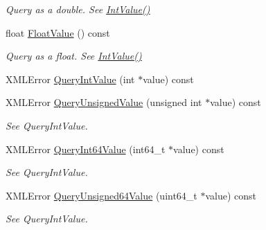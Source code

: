 \begin{DoxyCompactItemize}
\begin{DoxyCompactList}\small\item\em Query as a double. See \hyperlink{classtinyxml2_1_1_x_m_l_attribute_adfa2433f0fdafd5c3880936de9affa80}{Int\+Value()} \end{DoxyCompactList}\item 
\mbox{\label{classtinyxml2_1_1_x_m_l_attribute_a27797b45d21c981257720db94f5f8801}} 
float \hyperlink{classtinyxml2_1_1_x_m_l_attribute_a27797b45d21c981257720db94f5f8801}{Float\+Value} () const
\begin{DoxyCompactList}\small\item\em Query as a float. See \hyperlink{classtinyxml2_1_1_x_m_l_attribute_adfa2433f0fdafd5c3880936de9affa80}{Int\+Value()} \end{DoxyCompactList}\item 
X\+M\+L\+Error \hyperlink{classtinyxml2_1_1_x_m_l_attribute_a6d5176260db00ea301c01af8457cd993}{Query\+Int\+Value} (int $\ast$value) const
\item 
\mbox{\label{classtinyxml2_1_1_x_m_l_attribute_a48a7f3496f1415832e451bd8d09c9cb9}} 
X\+M\+L\+Error \hyperlink{classtinyxml2_1_1_x_m_l_attribute_a48a7f3496f1415832e451bd8d09c9cb9}{Query\+Unsigned\+Value} (unsigned int $\ast$value) const
\begin{DoxyCompactList}\small\item\em See Query\+Int\+Value. \end{DoxyCompactList}\item 
\mbox{\label{classtinyxml2_1_1_x_m_l_attribute_a4e25344d6e4159026be34dbddf1dcac2}} 
X\+M\+L\+Error \hyperlink{classtinyxml2_1_1_x_m_l_attribute_a4e25344d6e4159026be34dbddf1dcac2}{Query\+Int64\+Value} (int64\+\_\+t $\ast$value) const
\begin{DoxyCompactList}\small\item\em See Query\+Int\+Value. \end{DoxyCompactList}\item 
\mbox{\label{classtinyxml2_1_1_x_m_l_attribute_af793c695e7ee65cf20b8010d38b1d157}} 
X\+M\+L\+Error \hyperlink{classtinyxml2_1_1_x_m_l_attribute_af793c695e7ee65cf20b8010d38b1d157}{Query\+Unsigned64\+Value} (uint64\+\_\+t $\ast$value) const
\begin{DoxyCompactList}\small\item\em See Query\+Int\+Value. \end{DoxyCompactList}\item 

\end{DoxyCompactItemize}
